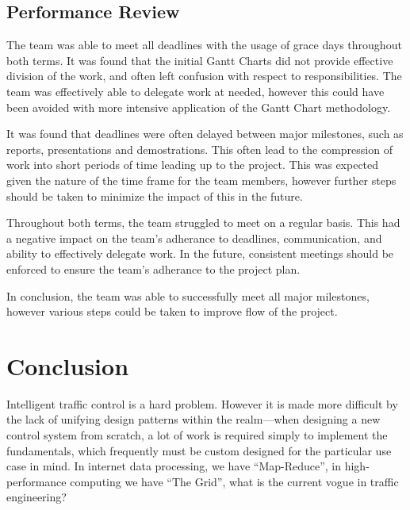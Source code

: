 \documentclass{report}
\begin{document}
\subsection{Performance Review}
The team was able to meet all deadlines with the usage of grace days throughout both terms. It was found that the initial Gantt Charts did not provide effective division of the work, and often left confusion with respect to responsibilities. The team was effectively able to delegate work at needed, however this could have been avoided with more intensive application of the Gantt Chart methodology.

It was found that deadlines were often delayed between major milestones, such as reports, presentations and demostrations. This often lead to the compression of work into short periods of time leading up to the project. This was expected given the nature of the time frame for the team members, however further steps should be taken to minimize the impact of this in the future.

Throughout both terms, the team struggled to meet on a regular basis. This had a negative impact on the team's adherance to deadlines, communication, and ability to effectively delegate work. In the future, consistent meetings should be enforced to ensure the team's adherance to the project plan.

In conclusion, the team was able to successfully meet all major milestones, however various steps could be taken to improve flow of the project. 

\newpage
\section{Conclusion}
Intelligent traffic control is a hard problem.
However it is made more difficult by the lack of unifying design patterns within the realm---when designing a new control system from scratch, a lot of work is required simply to implement the fundamentals, which frequently must be custom designed for the particular use case in mind.
In internet data processing, we have ``Map-Reduce'', in high-performance computing we have ``The Grid'', what is the current vogue in traffic engineering?
\end{document}
